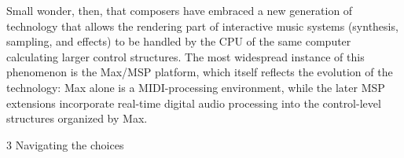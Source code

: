 \documentclass{ppgmus}
\begin{document}
Small wonder, then, that composers have
embraced a new generation of technology that
allows the rendering part of interactive music
systems (synthesis, sampling, and effects) to be
handled by the CPU of the same computer
calculating larger control structures. The most
widespread instance of this phenomenon is the
Max/MSP platform, which itself reflects the
evolution of the technology: Max alone is a
MIDI-processing environment, while the later
MSP extensions incorporate real-time digital
audio processing into the control-level structures
organized by Max.


3 Navigating the choices 
\end{document}

